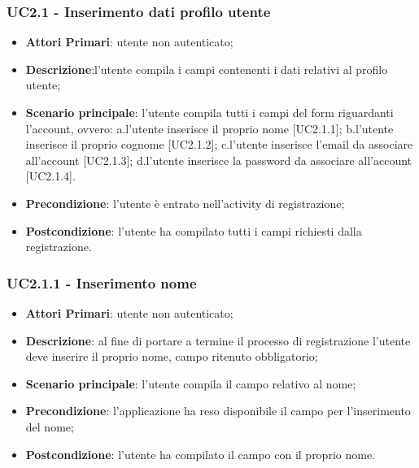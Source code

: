 \subsubsection{UC2.1 - Inserimento dati profilo utente}
\begin{itemize}
	\item \textbf{Attori Primari}: utente non autenticato;
	\item \textbf{Descrizione}:l'utente compila i campi contenenti i dati relativi al profilo utente;
	\item \textbf{Scenario principale}: l'utente compila tutti i campi del form riguardanti l'account, ovvero:
	a.l'utente inserisce il proprio nome [UC2.1.1];
	\newline
	b.l'utente inserisce il proprio cognome [UC2.1.2];
	\newline
	c.l'utente inserisce l'email da associare all'account [UC2.1.3];
	\newline
	d.l'utente inserisce la password da associare all'account [UC2.1.4].
	\item \textbf{Precondizione}: l'utente è entrato nell'activity di registrazione;
	\item \textbf{Postcondizione}: l'utente ha compilato tutti i campi richiesti dalla registrazione.
	
\end{itemize}
\subsubsection{UC2.1.1 - Inserimento nome}
\begin{itemize}
	\item \textbf{Attori Primari}: utente non autenticato;
	\item \textbf{Descrizione}: al fine di portare a termine il processo di registrazione l'utente deve inserire il proprio nome, campo ritenuto obbligatorio;
	\item \textbf{Scenario principale}: l'utente compila il campo relativo al nome;	
	\item \textbf{Precondizione}: l'applicazione ha reso disponibile il campo per l'inserimento del nome;
	\item \textbf{Postcondizione}: l'utente ha compilato il campo con il proprio nome.	
\end{itemize}
